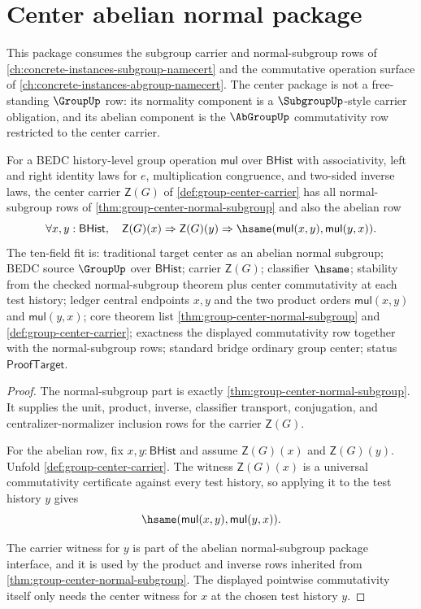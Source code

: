\section{Center abelian normal package}
\label{sec:group-center-abelian-normal-package}

This package consumes the subgroup carrier and normal-subgroup rows of \autoref{ch:concrete-instances-subgroup-namecert} and the commutative operation surface of \autoref{ch:concrete-instances-abgroup-namecert}. The center package is not a free-standing $\GroupUp$ row: its normality component is a $\SubgroupUp$-style carrier obligation, and its abelian component is the $\AbGroupUp$ commutativity row restricted to the center carrier.

\begin{theorem}
\label{thm:group-center-abelian-normal-subgroup-package}
For a BEDC history-level group operation $\mathsf{mul}$ over
$\mathsf{BHist}$ with associativity, left and right identity laws for $e$,
multiplication congruence, and two-sided inverse laws, the center carrier
$\mathsf{Z}(G)$ of \autoref{def:group-center-carrier} has all
normal-subgroup rows of \autoref{thm:group-center-normal-subgroup} and also
the abelian row
$$
\forall x,y:\mathsf{BHist},\quad
\mathsf{Z}(G)(x)\Rightarrow
\mathsf{Z}(G)(y)\Rightarrow
\hsame(\mathsf{mul}(x,y),\mathsf{mul}(y,x)).
$$
The ten-field fit is: traditional target center as an abelian normal subgroup;
BEDC source $\GroupUp$ over $\mathsf{BHist}$; carrier $\mathsf{Z}(G)$;
classifier $\hsame$; stability from the checked normal-subgroup theorem plus
center commutativity at each test history; ledger central endpoints $x,y$ and
the two product orders $\mathsf{mul}(x,y)$ and $\mathsf{mul}(y,x)$; core
theorem list \autoref{thm:group-center-normal-subgroup} and
\autoref{def:group-center-carrier}; exactness the displayed commutativity row
together with the normal-subgroup rows; standard bridge ordinary group center;
status $\mathsf{ProofTarget}$.
\end{theorem}
\begin{proof}
The normal-subgroup part is exactly
\autoref{thm:group-center-normal-subgroup}. It supplies the unit, product,
inverse, classifier transport, conjugation, and centralizer-normalizer
inclusion rows for the carrier $\mathsf{Z}(G)$.

For the abelian row, fix $x,y:\mathsf{BHist}$ and assume
$\mathsf{Z}(G)(x)$ and $\mathsf{Z}(G)(y)$. Unfold
\autoref{def:group-center-carrier}. The witness $\mathsf{Z}(G)(x)$ is a
universal commutativity certificate against every test history, so applying it
to the test history $y$ gives
$$
\hsame(\mathsf{mul}(x,y),\mathsf{mul}(y,x)).
$$

The carrier witness for $y$ is part of the abelian normal-subgroup package
interface, and it is used by the product and inverse rows inherited from
\autoref{thm:group-center-normal-subgroup}. The displayed pointwise
commutativity itself only needs the center witness for $x$ at the chosen test
history $y$.
\end{proof}
